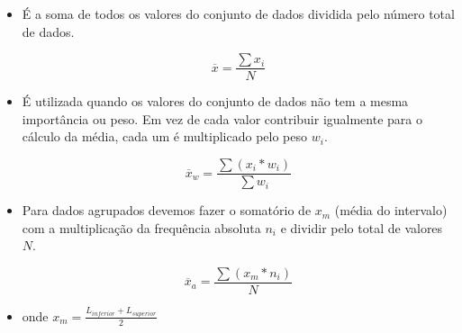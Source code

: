\documentclass[a4paper,11pt]{article}
\begin{document}
\begin{itemize}
    \item É a soma de todos os valores do conjunto de dados dividida pelo número total de dados.

    \[\overline{x} = \frac{\sum x_i}{N}\]

    \item É utilizada quando os valores do conjunto de dados não tem a mesma importância ou peso. Em vez de cada valor contribuir igualmente para o cálculo da média, cada um é multiplicado pelo peso $w_i$.

    \[\overline{x}_w = \frac{\sum(x_i*w_i)}{\sum w_i}\]


    \item Para dados agrupados devemos fazer o somatório de $x_m$ (média do intervalo) com a multiplicação da frequência absoluta $n_i$ e dividir pelo total de valores $N$.

    \[\overline{x}_a = \frac{\sum(x_m * n_i)}{N}\]

    \item onde $x_m = \frac{L_{inferior} + L_{superior}}{2}$


\end{itemize}
\end{document}
